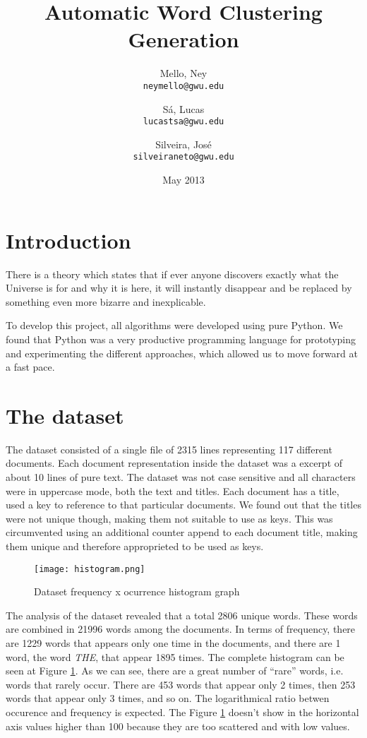 \documentclass{article}
\title{Automatic Word Clustering Generation}
\author{
  Mello, Ney\\
  \texttt{neymello@gwu.edu}
  \and
  Sá, Lucas\\
  \texttt{lucastsa@gwu.edu}
  \and
  Silveira, José\\
  \texttt{silveiraneto@gwu.edu}
}
\date{May 2013}
\begin{document}
\maketitle

\section{Introduction}
There is a theory which states that if ever anyone discovers exactly what
 the Universe is for and why it is here, 
it will instantly disappear and be replaced by something even more bizarre 
and inexplicable. \citep{kowalski2011information}

To develop this project, all algorithms were developed using pure Python. We found that Python was a very productive programming language for prototyping and experimenting the different approaches, which allowed us to move forward at a fast pace.

\section{The dataset}
The dataset consisted of a single file of 2315 lines representing 117 different documents. Each document representation inside the dataset was a excerpt of about 10 lines of pure text. The dataset was not case sensitive and all characters were in uppercase mode, both the text and titles. Each document has a title, used a key to reference to that particular documents. We found out that the titles were not unique though, making them not suitable to use as keys. This was circumvented using an additional counter append to each document title, making them unique and therefore approprieted to be used as keys.

\begin{figure}[h!]
    \centering
    \texttt{[image: histogram.png]}
    \caption{Dataset frequency x ocurrence histogram graph}
    \label{fig:histogram}
\end{figure}

The analysis of the dataset revealed that a total 2806 unique words. These words are combined in 21996 words among the documents. In terms of frequency, there are 1229 words that appears only one time in the documents, and there are 1 word, the word \emph{THE}, that appear 1895 times. The complete histogram can be seen at Figure \ref{fig:histogram}. As we can see, there are a great number of ``rare'' words, i.e. words that rarely occur. There are 453 words that appear only 2 times, then 253 words that appear only 3 times, and so on. The logarithmical ratio betwen occurence and frequency is expected. The Figure \ref{fig:histogram} doesn't show in the horizontal axis values higher than 100 because they are too scattered and with low values. 
\end{document}
